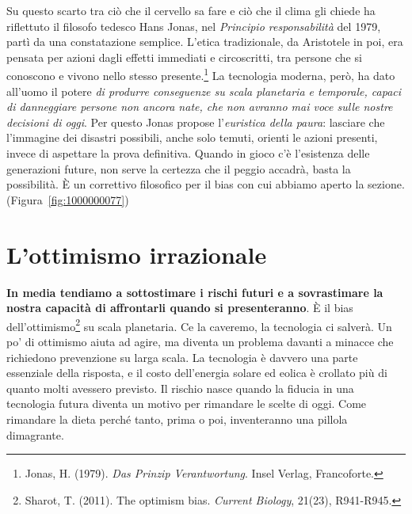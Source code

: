 Su questo scarto tra ci\`{o} che il cervello sa fare e ci\`{o} che il clima gli chiede ha riflettuto il filosofo tedesco Hans Jonas, nel \textit{Principio responsabilit\`{a}} del 1979, part\`{i} da una constatazione semplice. L'etica tradizionale, da Aristotele in poi, era pensata per azioni dagli effetti immediati e circoscritti, tra persone che si conoscono e vivono nello stesso presente.\footnote{Jonas, H. (1979). \textit{Das Prinzip Verantwortung}. Insel Verlag, Francoforte.} La tecnologia moderna, per\`{o}, ha dato all'uomo il potere \textit{di produrre conseguenze su scala planetaria e temporale, capaci di danneggiare persone non ancora nate, che non avranno mai voce sulle nostre decisioni di oggi}. Per questo Jonas propose l'\textit{euristica della paura}: lasciare che l'immagine dei disastri possibili, anche solo temuti, orienti le azioni presenti, invece di aspettare la prova definitiva. Quando in gioco c'\`{e} l'esistenza delle generazioni future, non serve la certezza che il peggio accadr\`{a}, basta la possibilit\`{a}. \`{E} un correttivo filosofico per il bias con cui abbiamo aperto la sezione. (Figura~\ref{fig:1000000077})


\section{L'ottimismo irrazionale}

\textbf{In media tendiamo a sottostimare i rischi futuri e a sovrastimare la nostra capacit\`{a} di affrontarli quando si presenteranno}. \`{E} il bias dell'ottimismo\footnote{Sharot, T. (2011). The optimism bias. \textit{Current Biology}, 21(23), R941-R945.} su scala planetaria. Ce la caveremo, la tecnologia ci salver\`{a}. Un po' di ottimismo aiuta ad agire, ma diventa un problema davanti a minacce che richiedono prevenzione su larga scala. La tecnologia è davvero una parte essenziale della risposta, e il costo dell'energia solare ed eolica è crollato più di quanto molti avessero previsto. Il rischio nasce quando la fiducia in una tecnologia futura diventa un motivo per rimandare le scelte di oggi. Come rimandare la dieta perch\'{e} tanto, prima o poi, inventeranno una pillola dimagrante.

